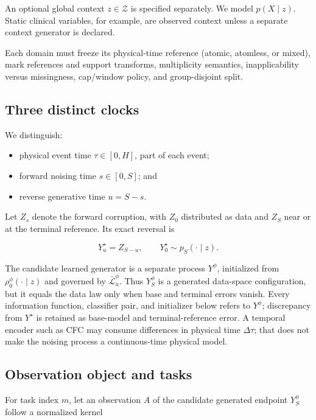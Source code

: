 \documentclass[11pt]{article}
\begin{document}
An optional global context \(z\in\mathcal Z\) is specified separately. We model \(p(X\mid z)\). Static clinical variables, for example, are observed context unless a separate context generator is declared.

Each domain must freeze its physical-time reference (atomic, atomless, or mixed), mark references and support transforms, multiplicity semantics, inapplicability versus missingness, cap/\allowbreak{}window policy, and group-disjoint split.

\subsection{Three distinct clocks}
\label{sec:three-distinct-clocks}

We distinguish:

\begin{itemize}
\item physical event time \(\tau\in[0,H]\), part of each event;
\item forward noising time \(s\in[0,S]\); and
\item reverse generative time \(u=S-s\).
\end{itemize}

Let \(Z_s\) denote the forward corruption, with \(Z_0\) distributed as data and \(Z_S\) near or at the terminal reference. Its exact reversal is

\[
Y_u^\star=Z_{S-u},\qquad Y_0^\star\sim p_S(\cdot\mid z).
\]

The candidate learned generator is a separate process \(Y^\phi\), initialized from \(\rho_0^\phi(\cdot\mid z)\) and governed by \(\bar{\mathcal L}_u^\phi\). Thus \(Y_S^\phi\) is a generated data-space configuration, but it equals the data law only when base and terminal errors vanish. Every information function, classifier pair, and initializer below refers to \(Y^\phi\); discrepancy from \(Y^\star\) is retained as base-model and terminal-reference error. A temporal encoder such as CFC may consume differences in physical time \(\Delta\tau\); that does not make the noising process a continuous-time physical model.

\subsection{Observation object and tasks}
\label{sec:observation-object-and-tasks}

For task index \(m\), let an observation \(A\) of the candidate generated endpoint \(Y_S^\phi\) follow a normalized kernel
\end{document}
